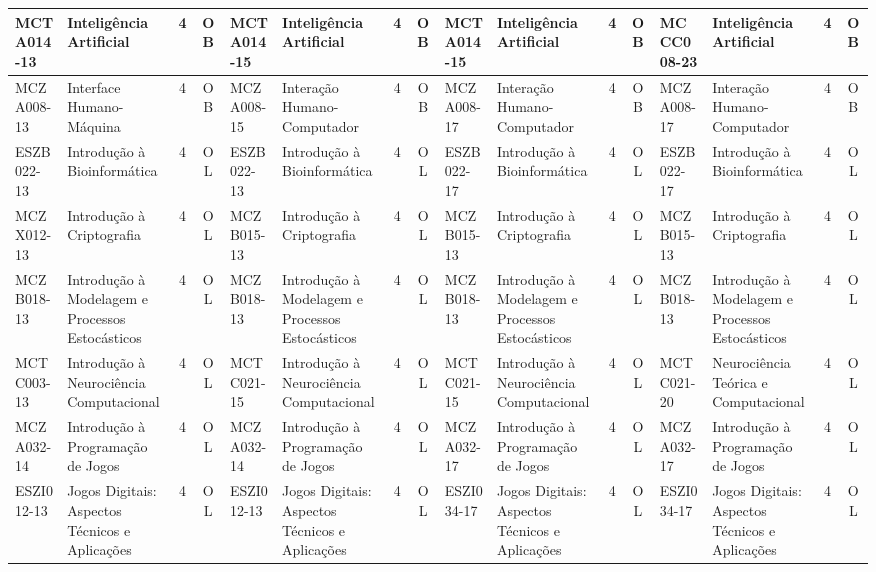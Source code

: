 \documentclass[a4paper]{article}
\begin{document}
\begin{landscape}
{\begin{longtable}{|l|p{.15\textheight}|c|c||l|p{.15\textheight}|c|c||l|p{.15\textheight}|c|c||l|p{.15\textheight}|c|c|}
    MCTA014-13 & Inteligência Artificial & 4 & OB &
    MCTA014-15 & Inteligência Artificial & 4 & OB &
    MCTA014-15 & Inteligência Artificial & 4 & OB &
    MCCC008-23 & Inteligência Artificial & 4 & OB \\ \hline

    MCZA008-13 & Interface Humano-Máquina    & 4 & OB &
    MCZA008-15 & Interação Humano-Computador & 4 & OB &
    MCZA008-17 & Interação Humano-Computador & 4 & OB &
    MCZA008-17 & Interação Humano-Computador & 4 & OB \\ \hline


    ESZB022-13 & Introdução à Bioinformática & 4 & OL &
    ESZB022-13 & Introdução à Bioinformática & 4 & OL &
    ESZB022-17 & Introdução à Bioinformática & 4 & OL & 
    ESZB022-17 & Introdução à Bioinformática & 4 & OL \\ \hline

    MCZX012-13 & Introdução à Criptografia & 4 & OL &
    MCZB015-13 & Introdução à Criptografia & 4 & OL &
    MCZB015-13 & Introdução à Criptografia & 4 & OL & 
    MCZB015-13 & Introdução à Criptografia & 4 & OL \\ \hline

    MCZB018-13 & Introdução à Modelagem e Processos Estocásticos & 4 & OL &
    MCZB018-13 & Introdução à Modelagem e Processos Estocásticos & 4 & OL &
    MCZB018-13 & Introdução à Modelagem e Processos Estocásticos & 4 & OL &
    MCZB018-13 & Introdução à Modelagem e Processos Estocásticos & 4 & OL \\ \hline

    MCTC003-13 & Introdução à Neurociência Computacional & 4 & OL &
    MCTC021-15 & Introdução à Neurociência Computacional & 4 & OL &
    MCTC021-15 & Introdução à Neurociência Computacional & 4 & OL & 
    MCTC021-20 & Neurociência Teórica e Computacional    & 4 & OL \\ \hline

    MCZA032-14 & Introdução à Programação de Jogos & 4 & OL &
    MCZA032-14 & Introdução à Programação de Jogos & 4 & OL &
    MCZA032-17 & Introdução à Programação de Jogos & 4 & OL &
    MCZA032-17 & Introdução à Programação de Jogos & 4 & OL \\ \hline

    ESZI012-13 & Jogos Digitais: Aspectos Técnicos e Aplicações & 4 & OL &
    ESZI012-13 & Jogos Digitais: Aspectos Técnicos e Aplicações & 4 & OL &
    ESZI034-17 & Jogos Digitais: Aspectos Técnicos e Aplicações & 4 & OL &
    ESZI034-17 & Jogos Digitais: Aspectos Técnicos e Aplicações & 4 & OL \\ \hline


\end{longtable}}
\end{landscape}
\end{document}
